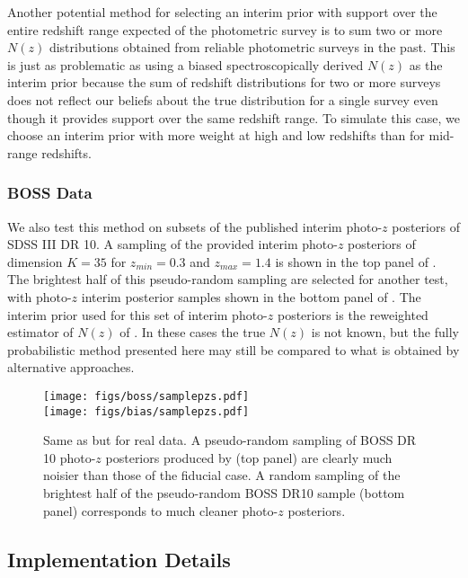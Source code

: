 Another potential method for selecting an interim prior with support over the entire redshift range expected of the photometric survey is to sum two or more $N(z)$ distributions obtained from reliable photometric surveys in the past.  
This is just as problematic as using a biased spectroscopically derived $N(z)$ as the interim prior because the sum of redshift distributions for two or more surveys does not reflect our beliefs about the true distribution for a single survey even though it provides support over the same redshift range.  
To simulate this case, we choose an interim prior with more weight at high and low redshifts than for mid-range redshifts.  

\subsubsection{BOSS Data}

We also test this method on subsets of the published interim photo-$z$ posteriors of SDSS III DR 10. 
A sampling of the provided interim photo-$z$ posteriors of dimension $K=35$ for $z_{min}=0.3$ and $z_{max}=1.4$ is shown in the top panel of .  
The brightest half of this pseudo-random sampling are selected for another test, with photo-$z$ interim posterior samples shown in the bottom panel of .  
The interim prior used for this set of interim photo-$z$ posteriors is the reweighted estimator of $N(z)$ of \citet{Sheldon2012}.  
In these cases the true $N(z)$ is not known, but the fully probabilistic method presented here may still be compared to what is obtained by alternative approaches.

\begin{figure}
	\texttt{[image: figs/boss/samplepzs.pdf]}\\
	\texttt{[image: figs/bias/samplepzs.pdf]}
	\caption{Same as  but for real data.  
		A pseudo-random sampling of BOSS DR 10 photo-$z$ posteriors produced by \citet{Sheldon2012} (top panel) are clearly much noisier than those of the fiducial case.  
		A random sampling of the brightest half of the pseudo-random BOSS DR10 sample (bottom panel) corresponds to much cleaner photo-$z$ posteriors.}
\end{figure}

\subsection{Implementation Details}


